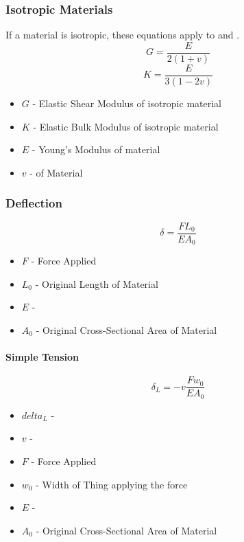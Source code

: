 		\subsubsection{Isotropic Materials} \label{subsubsec:Isotropic Materials}
		If a material is isotropic, these equations apply to  and .
			\begin{equation} \label{eq:Isotropic Elastic Shear Modulus}
				G = \frac{E}{2 \left( 1+v \right)}
			\end{equation}
			\begin{equation} \label{eq:Isotropic Elastic Bulk Modulus}
				K = \frac{E}{3 \left( 1-2v \right)}
			\end{equation}
			\begin{itemize}[noitemsep]
				\item $G$ - Elastic Shear Modulus of isotropic material
				\item $K$ - Elastic Bulk Modulus of isotropic material
				\item $E$ - Young's Modulus of material
				\item $v$ -  of Material
			\end{itemize}
			
		\subsubsection{Deflection} \label{subsubsec:Deflection}
			\begin{equation} \label{eq:Deflection}
				\delta = \frac{F L_{0}}{E A_{0}}
			\end{equation}
			\begin{itemize}[noitemsep]
				\item $F$ - Force Applied
				\item $L_{0}$ - Original Length of Material
				\item $E$ - 
				\item $A_{0}$ - Original Cross-Sectional Area of Material
			\end{itemize}
			
			\paragraph{Simple Tension} \label{par:Simple Tension}
				\begin{equation} \label{eq:Simple Tension}
					\delta_{L} = -v \frac{F w_{0}}{E A_{0}}
				\end{equation}
				\begin{itemize}[noitemsep]
					\item $delta_{L}$ - 
					\item $v$ - 
					\item $F$ - Force Applied
					\item $w_{0}$ - Width of Thing applying the force
					\item $E$ - 
					\item $A_{0}$ - Original Cross-Sectional Area of Material
				\end{itemize}
		
